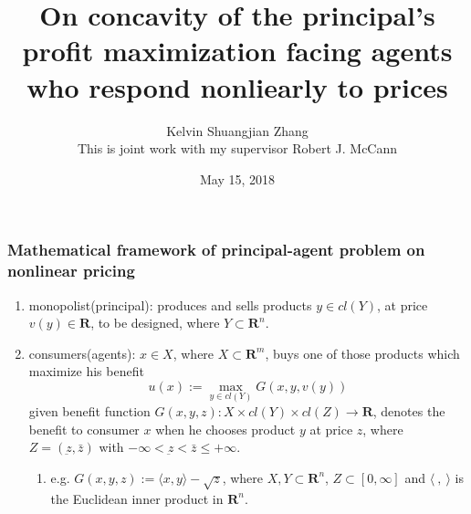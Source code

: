\documentclass[]{beamer}
\title[Concavity of Principal-Agent Maximization Problem]{\textbf{On concavity of the principal's profit maximization facing agents who respond nonliearly to prices %
		} }
\author[Kelvin Shuangjian Zhang with Robert McCann]{Kelvin Shuangjian Zhang\\This is joint work with my supervisor Robert J. McCann}
\institute{University of Toronto}
\date{
 May 15, 2018}
\theoremstyle{plain}
\theoremstyle{plain} %
\theoremstyle{definition}
\theoremstyle{remark}
\newcommand{\R}{\mathbf{R}}
\begin{document}
\frame{\titlepage}


\section[Introduction]{}
\subsection{}
	
	
	
	
\frame
{
  \frametitle{Mathematical framework of principal-agent problem on nonlinear pricing}
  \begin{enumerate}[\topsep=0ex]
    \item monopolist(principal): produces and sells products  $y \in cl(Y)$, at price $v(y)\in \R$, to be designed, where $Y \subset {\R^n}$. 
    \item  consumers(agents): $x\in X$, where $X \subset \R^m$, buys one of those products which maximize his benefit 
    \begin{equation}\label{1}
    u (x) := \max_{y \in cl(Y)} G(x, y, v(y))
    \end{equation}
    given benefit function $G(x,y,z): X\times cl(Y) \times cl(Z) \longrightarrow \R$, denotes the benefit to consumer $x$ when he chooses product $y$ at price $z$, where $Z=(\underbar z,\bar z) $ with $-\infty <\underbar z < \bar z \le +\infty$.
    \begin{enumerate}[\topsep=0ex]
    	\item  e.g. $G(x,y,z) :=  \langle x, y \rangle - \sqrt{z}$, where $X,Y \subset \R^n$, $Z\subset [0, \infty]$ and $\langle \ ,\ \rangle$ is the Euclidean inner product in $\R^n$.
    \end{enumerate}
  \end{enumerate}
}
\end{document}
